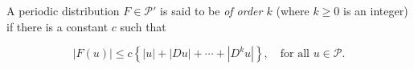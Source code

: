 A periodic distribution $F \in \mathcal{P}'$ is said to be \textit{of order $k$} (where $k \geq 0$ is an integer) if there is a constant $c$ such that

$$|F(u)| \leq c \left\{ |u| + |Du| + \cdots + |D^k u| \right\}, \quad \text{for all } u \in \mathcal{P}.$$

